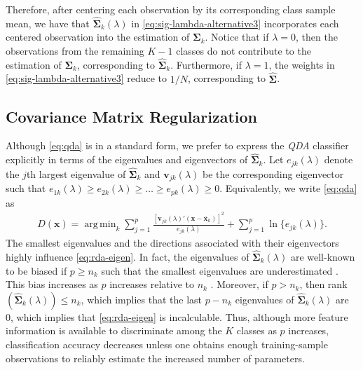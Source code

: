 \documentclass[11pt]{article}
\newcommand{\xbar}{\bar{\bm x}}
\DeclareMathOperator*{\argmin}{arg\,min}
\begin{document}
Therefore, after centering each observation by its corresponding class sample mean, we have that $\widehat{\bm\Sigma}_k(\lambda)$ in \eqref{eq:sig-lambda-alternative3} incorporates each centered observation into the estimation of $\bm \Sigma_k$. Notice that if $\lambda  = 0$, then the observations from the remaining $K - 1$ classes do not contribute to the estimation of $\bm \Sigma_k$, corresponding to $\widehat{\bm \Sigma}_k$. Furthermore, if $\lambda = 1$, the weights in \eqref{eq:sig-lambda-alternative3} reduce to $1/N$, corresponding to $\widehat{\bm\Sigma}$.

\subsection{Covariance Matrix Regularization}

Although \eqref{eq:qda} is in a standard form, we prefer to express the \emph{QDA} classifier explicitly in terms of the eigenvalues and eigenvectors of $\widehat{\bm \Sigma}_k$. Let $e_{jk}(\lambda)$ denote the $j$th largest eigenvalue of $\widehat{\bm\Sigma}_k$ and $\bm v_{jk}(\lambda)$ be the corresponding eigenvector such that $e_{1k}(\lambda) \ge e_{2k}(\lambda) \ge \ldots \ge e_{pk}(\lambda) \ge 0$. Equivalently, we write \eqref{eq:qda} as
\begin{align}
  D(\bm x) = \argmin_{k} \sum_{j = 1}^p \frac{[\bm v_{jk}(\lambda)' (\bm x - \bm \xbar_k)]^2}{e_{jk}(\lambda)} + \sum_{j=1}^p \ln \{e_{jk}(\lambda)\}. \label{eq:rda-eigen}
\end{align}
The smallest eigenvalues and the directions associated with their eigenvectors highly influence \eqref{eq:rda-eigen}. In fact, the eigenvalues of $\widehat{\bm \Sigma}_k(\lambda)$ are well-known to be biased if $p \ge n_k$ such that the smallest eigenvalues are underestimated \citep{Seber:2004uh}. This bias increases as $p$ increases relative to $n_k$ \citep{TODONeedCitation}. Moreover, if $p > n_k$, then rank$(\widehat{\bm \Sigma}_k(\lambda)) \le n_k$, which implies that the last $p - n_k$ eigenvalues of $\widehat{\bm \Sigma}_k(\lambda)$ are 0, which implies that \eqref{eq:rda-eigen} is incalculable. Thus, although more feature information is available to discriminate among the $K$ classes as $p$ increases, classification accuracy decreases unless one obtains enough training-sample observations to reliably estimate the increased number of parameters.
\end{document}
